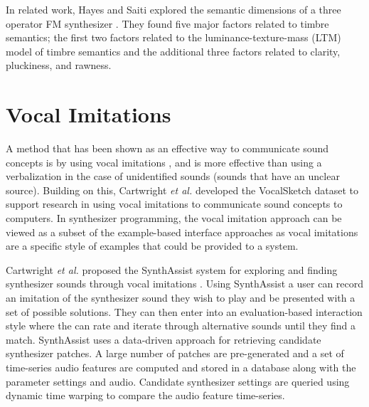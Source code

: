 In related work, Hayes and Saiti explored the semantic dimensions of a three operator FM synthesizer \cite{hayes2020there}. %
They found five major factors related to timbre semantics; the first two factors related to the  luminance-texture-mass (LTM) model of timbre semantics \cite{zacharakis2012interlanguage} and the additional three factors related to clarity, pluckiness, and rawness.


\section{Vocal Imitations}
A method that has been shown as an effective way to communicate sound concepts is by using vocal imitations \cite{lemaitre2014effectiveness}, and is more effective than using a verbalization in the case of unidentified sounds (sounds that have an unclear source). Building on this, Cartwright \textit{et al.} developed the VocalSketch dataset \cite{cartwright2015vocalsketch} to support research in using vocal imitations to communicate sound concepts to computers. In synthesizer programming, the vocal imitation approach can be viewed as a subset of the example-based interface approaches as vocal imitations are a specific style of examples that could be provided to a system.

Cartwright \textit{et al.} proposed the SynthAssist system for exploring and finding synthesizer sounds through vocal imitations \cite{cartwright2014synthassist}. Using SynthAssist a user can record an imitation of the synthesizer sound they wish to play and be presented with a set of possible solutions. They can then enter into an evaluation-based interaction style where the can rate and iterate through alternative sounds until they find a match. SynthAssist uses a data-driven approach for retrieving candidate synthesizer patches. A large number of patches are pre-generated and a set of time-series audio features are computed and stored in a database along with the parameter settings and audio. Candidate synthesizer settings are queried using dynamic time warping to compare the audio feature time-series. 


